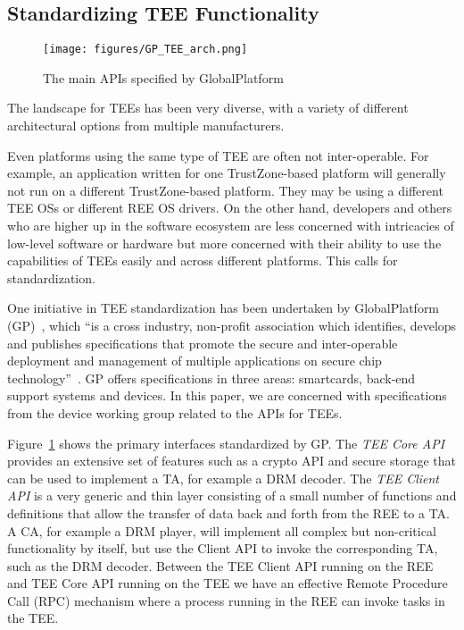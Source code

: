 \documentclass[10pt,conference,letterpaper]{IEEEtran}
\newif\ifabridged
\begin{document}
\subsection{Standardizing TEE Functionality}
\label{subsec:standards}

\begin{figure}[h]
\centering
\texttt{[image: figures/GP\_TEE\_arch.png]}
\caption{The main APIs specified by GlobalPlatform\protect~\cite{web:GP_TEE_SA}}
\label{fig:GP}
\end{figure}

The landscape for TEEs has been very diverse, with a variety of different architectural options from multiple manufacturers. 
\ifabridged
\footnote{For a detailed description of different TEE architectural options, we refer the reader to the full version of this paper~\cite{MDNA15}.}
\fi
Even platforms using the same type of TEE are often not inter-operable. For example, an application written for one TrustZone-based platform will generally not run on a different TrustZone-based platform. They may be using a different TEE OSs or different REE OS drivers. On the other hand, developers and others who are higher up in the software ecosystem are less concerned with intricacies of low-level software or hardware but more concerned with their ability to use the capabilities of TEEs easily and across different platforms. This calls for standardization.


One initiative in TEE standardization has been undertaken by GlobalPlatform (GP)~\cite{web:GP}, which ``is a cross industry, non-profit association which identifies, develops and publishes specifications that promote the secure and inter-operable deployment and management of multiple applications on secure chip technology''~\cite{web:GP_ABOUT}.  GP offers specifications in three areas: smartcards, back-end support systems and devices.  In this paper, we are concerned with specifications from the device working group related to the APIs for TEEs.

Figure~\ref{fig:GP} shows the primary interfaces standardized by GP. 
The \emph{TEE Core API} provides an extensive set of features such as a crypto API and secure storage that can be used to implement a TA, for example a DRM decoder.
The \emph{TEE Client API} is a very generic and thin layer consisting of a small number of functions and definitions that allow the transfer of data back and forth from the REE to a TA.  A CA, for example a DRM player, will implement all complex but non-critical functionality by itself, but use the Client API to invoke the corresponding TA, such as the DRM decoder.
Between the TEE Client API running on the REE and TEE Core API running on the TEE we have an effective Remote Procedure Call (RPC) mechanism where a process running in the REE can invoke tasks in the TEE.
\end{document}
